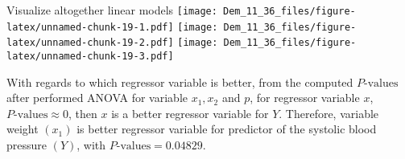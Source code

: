 \documentclass[
]{article}
\begin{document}
Visualize altogether linear models
\texttt{[image: Dem\_11\_36\_files/figure-latex/unnamed-chunk-19-1.pdf]}
\texttt{[image: Dem\_11\_36\_files/figure-latex/unnamed-chunk-19-2.pdf]}
\texttt{[image: Dem\_11\_36\_files/figure-latex/unnamed-chunk-19-3.pdf]}

With regards to which regressor variable is better, from the computed
\(P\text{-values}\) after performed ANOVA for variable \(x_1, x_2\) and
\(p\), for regressor variable \(x\), \(P\text{-values} \approx 0\), then
\(x\) is a better regressor variable for \(Y\). Therefore, variable
weight \((x_1)\) is better regressor variable for predictor of the
systolic blood pressure \((Y)\), with \(P\text{-values} = 0.04829\).
\end{document}
